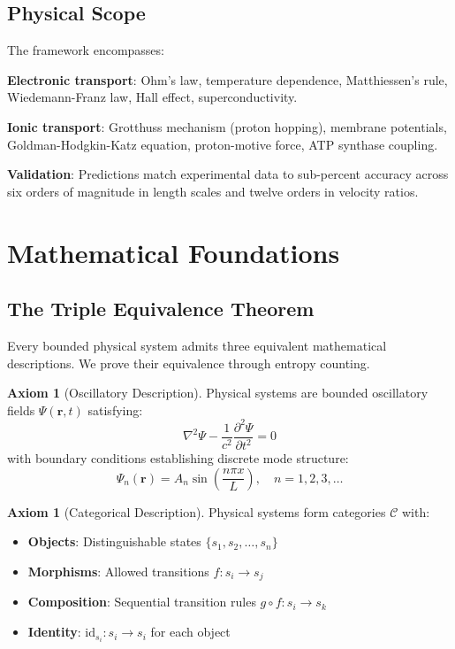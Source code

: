 \documentclass[twocolumn,10pt]{article}
\theoremstyle{definition}
\newtheorem{axiom}[theorem]{Axiom}
\theoremstyle{remark}
\begin{document}
\subsection{Physical Scope}

The framework encompasses:

\textbf{Electronic transport}: Ohm's law, temperature dependence, Matthiessen's rule, Wiedemann-Franz law, Hall effect, superconductivity.

\textbf{Ionic transport}: Grotthuss mechanism (proton hopping), membrane potentials, Goldman-Hodgkin-Katz equation, proton-motive force, ATP synthase coupling.

\textbf{Validation}: Predictions match experimental data to sub-percent accuracy across six orders of magnitude in length scales and twelve orders in velocity ratios.

\section{Mathematical Foundations}
\label{sec:foundations}

\subsection{The Triple Equivalence Theorem}

Every bounded physical system admits three equivalent mathematical descriptions. We prove their equivalence through entropy counting.

\begin{axiom}[Oscillatory Description]
\label{ax:oscillatory}
Physical systems are bounded oscillatory fields $\Psi(\mathbf{r}, t)$ satisfying:
\begin{equation}
\nabla^2 \Psi - \frac{1}{c^2}\frac{\partial^2 \Psi}{\partial t^2} = 0
\end{equation}
with boundary conditions establishing discrete mode structure:
\begin{equation}
\Psi_n(\mathbf{r}) = A_n \sin\left(\frac{n\pi x}{L}\right), \quad n = 1, 2, 3, \ldots
\end{equation}
\end{axiom}

\begin{axiom}[Categorical Description]
\label{ax:categorical}
Physical systems form categories $\mathcal{C}$ with:
\begin{itemize}
    \item \textbf{Objects}: Distinguishable states $\{s_1, s_2, \ldots, s_n\}$
    \item \textbf{Morphisms}: Allowed transitions $f: s_i \to s_j$
    \item \textbf{Composition}: Sequential transition rules $g \circ f: s_i \to s_k$
    \item \textbf{Identity}: $\text{id}_{s_i}: s_i \to s_i$ for each object
\end{itemize}
\end{axiom}
\end{document}
